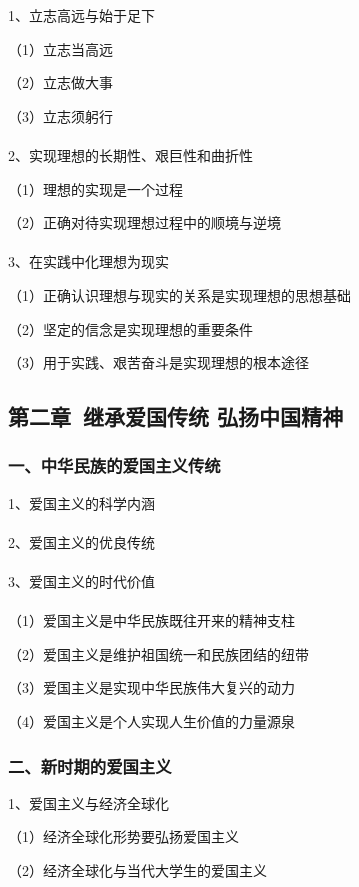\documentclass{ctexart}
\begin{document}
1、立志高远与始于足下

（1）立志当高远

（2）立志做大事

（3）立志须躬行
\\\\

2、实现理想的长期性、艰巨性和曲折性

（1）理想的实现是一个过程

（2）正确对待实现理想过程中的顺境与逆境
\\\\

3、在实践中化理想为现实

（1）正确认识理想与现实的关系是实现理想的思想基础

（2）坚定的信念是实现理想的重要条件

（3）用于实践、艰苦奋斗是实现理想的根本途径

\subsection{第二章\ 继承爱国传统 弘扬中国精神}

\subsubsection{一、中华民族的爱国主义传统}

1、爱国主义的科学内涵
\\\\

2、爱国主义的优良传统
\\\\

3、爱国主义的时代价值
\\\\	

（1）爱国主义是中华民族既往开来的精神支柱

（2）爱国主义是维护祖国统一和民族团结的纽带

（3）爱国主义是实现中华民族伟大复兴的动力

（4）爱国主义是个人实现人生价值的力量源泉

\subsubsection{二、新时期的爱国主义}
1、爱国主义与经济全球化

（1）经济全球化形势要弘扬爱国主义

（2）经济全球化与当代大学生的爱国主义
\\\\
\end{document}
